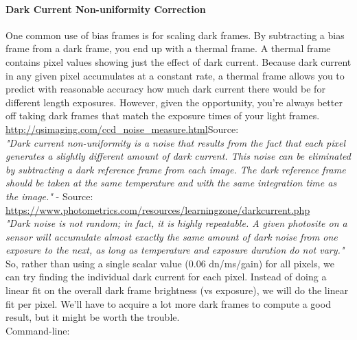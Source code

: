 \paragraph{Dark Current Non-uniformity Correction}

One common use of bias frames is for scaling dark frames. By subtracting a bias frame from a dark frame, you end up with a thermal frame. A thermal frame contains pixel values showing just the effect of dark current. Because dark current in any given pixel accumulates at a constant rate, a thermal frame allows you to predict with reasonable accuracy how much dark current there would be for different length exposures. However, given the opportunity, you’re always better off taking dark frames that match the exposure times of your light frames.\\

\href{http://qsimaging.com/ccd_noise_measure.html}{http://qsimaging.com/ccd\_noise\_measure.html}{Source}: \\

\textit{"Dark current non-uniformity is a noise that results from the fact that each pixel generates a slightly different amount of dark current. This noise can be eliminated by subtracting a dark reference frame from each image. The dark reference frame should be taken at the same temperature and with the same integration time as the image."} - Source: \href{https://www.photometrics.com/resources/learningzone/darkcurrent.php}{https://www.photometrics.com/resources/learningzone/darkcurrent.php}\\

\textit{"Dark noise is not random; in fact, it is highly repeatable. A given photosite on a sensor will accumulate almost exactly the same amount of dark noise from one exposure to the next, as long as temperature and exposure duration do not vary."}\\

So, rather than using a single scalar value (0.06 dn/ms/gain) for all pixels, we can try finding the individual dark current for each pixel. Instead of doing a linear fit on the overall dark frame brightness (vs exposure), we will do the linear fit per pixel. We'll have to acquire a lot more dark frames to compute a good result, but it might be worth the trouble.\\

Command-line:\\


